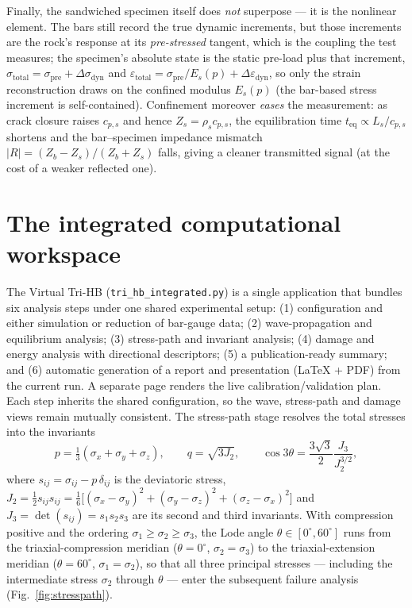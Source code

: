 \documentclass[11pt]{article}
\begin{document}
Finally, the sandwiched specimen itself does \emph{not} superpose --- it is the
nonlinear element. The bars still record the true dynamic increments, but those
increments are the rock's response at its \emph{pre-stressed} tangent, which is the
coupling the test measures; the specimen's absolute state is the static pre-load
plus that increment,
$\sigma_{\mathrm{total}}=\sigma_{\mathrm{pre}}+\Delta\sigma_{\mathrm{dyn}}$ and
$\varepsilon_{\mathrm{total}}=\sigma_{\mathrm{pre}}/E_s(p)+\Delta\varepsilon_{\mathrm{dyn}}$,
so only the strain reconstruction draws on the confined modulus $E_s(p)$ (the
bar-based stress increment is self-contained). Confinement moreover \emph{eases}
the measurement: as crack closure raises $c_{p,s}$ and hence $Z_s=\rho_s c_{p,s}$,
the equilibration time $t_{\mathrm{eq}}\propto L_s/c_{p,s}$ shortens and the
bar--specimen impedance mismatch $|R|=(Z_b-Z_s)/(Z_b+Z_s)$ falls, giving a cleaner
transmitted signal (at the cost of a weaker reflected one).

\section{The integrated computational workspace}\label{sec:twin}

The Virtual Tri-HB (\texttt{tri\_hb\_integrated.py}) is a single application that
bundles six analysis steps under one shared experimental setup: (1) configuration
and either simulation or reduction of bar-gauge data; (2) wave-propagation and
equilibrium analysis; (3) stress-path and invariant analysis; (4) damage and
energy analysis with directional descriptors; (5) a publication-ready summary;
and (6) automatic generation of a report and presentation (\LaTeX{} + PDF) from
the current run. A separate page renders the live calibration/validation plan.
Each step inherits the shared configuration, so the wave, stress-path and damage
views remain mutually consistent. The stress-path stage resolves the total
stresses into the invariants
\begin{equation}
p=\tfrac{1}{3}(\sigma_x+\sigma_y+\sigma_z),\qquad
q=\sqrt{3J_2},\qquad
\cos 3\theta=\frac{3\sqrt3}{2}\frac{J_3}{J_2^{3/2}},
\label{eq:invariants}
\end{equation}
where $s_{ij}=\sigma_{ij}-p\,\delta_{ij}$ is the deviatoric stress,
$J_2=\tfrac12 s_{ij}s_{ij}=\tfrac16\big[(\sigma_x-\sigma_y)^2+(\sigma_y-\sigma_z)^2+(\sigma_z-\sigma_x)^2\big]$
and $J_3=\det(s_{ij})=s_1s_2s_3$ are its second and third invariants. With compression positive and the ordering
$\sigma_1\ge\sigma_2\ge\sigma_3$, the Lode angle $\theta\in[0^\circ,60^\circ]$
runs from the triaxial-compression meridian ($\theta=0^\circ$, $\sigma_2=\sigma_3$)
to the triaxial-extension meridian ($\theta=60^\circ$, $\sigma_1=\sigma_2$), so
that all three principal stresses --- including the intermediate stress
$\sigma_2$ through $\theta$ --- enter the subsequent failure analysis
(Fig.~\ref{fig:stresspath}).
\end{document}
